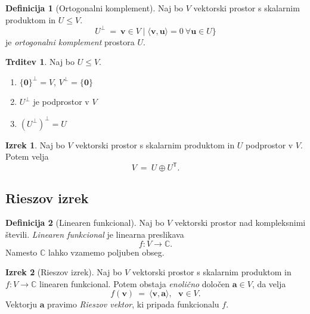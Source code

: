 \documentclass[11pt]{article}
\renewcommand{\a}{\mathbf{a}}
\renewcommand{\u}{\mathbf{u}}
\newcommand{\vv}{\mathbf{v}}
\newcommand{\0}{\mathbf{0}}
\renewcommand{\sp}[2]{\langle #1, #2 \rangle}
\newcommand{\T}{\mathsf{T}}
\theoremstyle{definition}
\newtheorem{definicija}{Definicija}[section]
\theoremstyle{definition}
\newtheorem{trditev}{Trditev}[section]
\theoremstyle{definition}
\newtheorem{izrek}{Izrek}[section]
\theoremstyle{definition}
\begin{document}
\begin{definicija}[Ortogonalni komplement]

Naj bo $V$ vektorski prostor s skalarnim produktom in $U \leq V$.
$$U^{\perp} ~=~ \vv \in V \mid  \sp{\vv}{\u} = 0 ~\forall \u \in U\}$$
je \textit{ortogonalni komplement} prostora $U$.

\end{definicija}
\vspace{0.5cm}

\begin{trditev}

Naj bo $U \leq V$.
\begin{enumerate}
	\item $\{\0\}^\perp = V$, $V^\perp = \{\0\}$
	\item $U^\perp$ je podprostor v $V$
	\item $(U^\perp)^\perp = U$
\end{enumerate}

\end{trditev}
\vspace{0.5cm}

\begin{izrek}

Naj bo $V$ vektorski prostor s skalarnim produktom in $U$ podprostor v $V$. Potem velja
$$V ~=~ U \oplus U^\T.$$

\end{izrek}
\vspace{0.5cm}


\subsection{Rieszov izrek}
\vspace{0.5cm}

\begin{definicija}[Linearen funkcional]

Naj bo $V$ vektorski prostor nad kompleksnimi števili. \textit{Linearen funkcional} je linearna preslikava
$$f: V \rightarrow \mathbb{C}.$$
Namesto $\mathbb{C}$ lahko vzamemo poljuben obseg.

\end{definicija}
\vspace{0.5cm}

\begin{izrek}[Rieszov izrek]

Naj bo $V$ vektorski prostor s skalarnim produktom in $f:V \rightarrow \mathbb{C}$ linearen funkcional. Potem obstaja \textit{enolično} določen $\a \in V$, da velja
$$f(\vv) ~=~ \sp{\vv}{\a}, ~~~\vv \in V.$$
Vektorju $\a$ pravimo \textit{Rieszov vektor}, ki pripada funkcionalu $f$.

\end{izrek}
\vspace{0.5cm}
\end{document}
